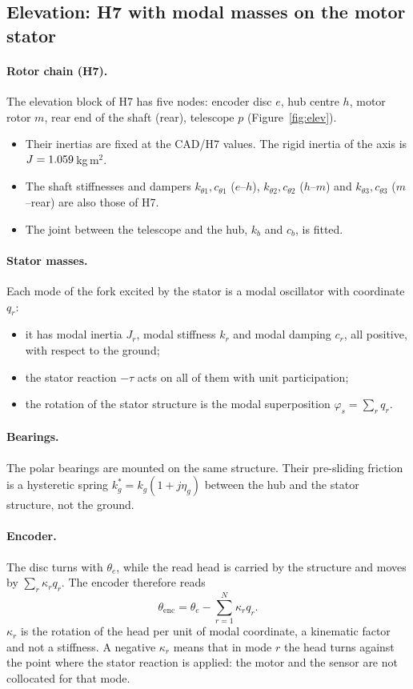 \documentclass[10pt,a4paper]{article}
\numberwithin{equation}{section}
\begin{document}
\subsection{Elevation: H7 with modal masses on the motor stator}\label{sec:elev}
\paragraph{Rotor chain (H7).} The elevation block of H7 has five nodes: encoder disc $e$, hub centre $h$, motor rotor $m$, rear end of the shaft (rear), telescope $p$ (Figure~\ref{fig:elev}).
\begin{itemize}
\item Their inertias are fixed at the CAD/H7 values. The rigid inertia of the axis is $J=1.059$\,kg\,m$^2$.
\item The shaft stiffnesses and dampers $k_{\theta1},c_{\theta1}$ ($e$--$h$), $k_{\theta2},c_{\theta2}$ ($h$--$m$) and $k_{\theta3},c_{\theta3}$ ($m$--rear) are also those of H7.
\item The joint between the telescope and the hub, $k_b$ and $c_b$, is fitted.
\end{itemize}
\paragraph{Stator masses.} Each mode of the fork excited by the stator is a modal oscillator with coordinate $q_r$:
\begin{itemize}
\item it has modal inertia $J_r$, modal stiffness $k_r$ and modal damping $c_r$, all positive, with respect to the ground;
\item the stator reaction $-\tau$ acts on all of them with unit participation;
\item the rotation of the stator structure is the modal superposition $\varphi_s=\sum_r q_r$.
\end{itemize}
\paragraph{Bearings.} The polar bearings are mounted on the same structure. Their pre-sliding friction is a hysteretic spring $k_g^*=k_g(1+j\eta_g)$ between the hub and the stator structure, not the ground.
\paragraph{Encoder.} The disc turns with $\theta_e$, while the read head is carried by the structure and moves by $\sum_r\kappa_r q_r$. The encoder therefore reads
\begin{equation}
\theta_\mathrm{enc}=\theta_e-\sum_{r=1}^{N}\kappa_r q_r .\label{eq:encoder}
\end{equation}
$\kappa_r$ is the rotation of the head per unit of modal coordinate, a kinematic factor and not a stiffness. A negative $\kappa_r$ means that in mode $r$ the head turns against the point where the stator reaction is applied: the motor and the sensor are not collocated for that mode.
\end{document}
